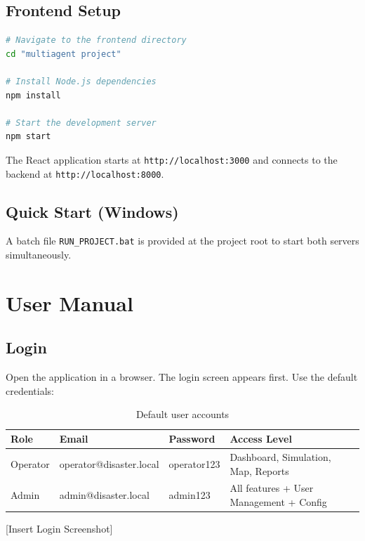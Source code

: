 \subsection{Frontend Setup}

\begin{lstlisting}[style=codestyle, language=bash, caption=Frontend installation and startup]
# Navigate to the frontend directory
cd "multiagent project"

# Install Node.js dependencies
npm install

# Start the development server
npm start
\end{lstlisting}

The React application starts at \texttt{http://localhost:3000} and connects to the backend at \texttt{http://localhost:8000}.

\subsection{Quick Start (Windows)}

A batch file \texttt{RUN\_PROJECT.bat} is provided at the project root to start both servers simultaneously.

\section{User Manual}
\label{sec:user_manual}

\subsection{Login}

Open the application in a browser. The login screen appears first. Use the default credentials:

\begin{table}[H]
\centering
\caption{Default user accounts}
\label{tab:default_users}
\begin{tabular}{|l|l|l|l|}
\hline
\textbf{Role} & \textbf{Email} & \textbf{Password} & \textbf{Access Level} \\
\hline
Operator & operator@disaster.local & operator123 & Dashboard, Simulation, Map, Reports \\
\hline
Admin & admin@disaster.local & admin123 & All features + User Management + Config \\
\hline
\end{tabular}
\end{table}

[Insert Login Screenshot]

